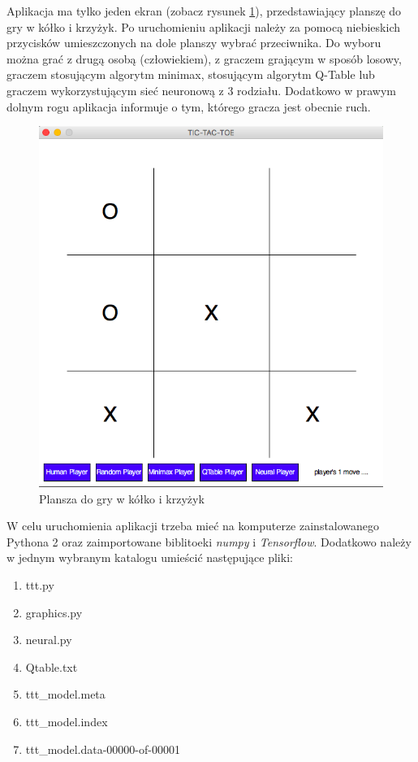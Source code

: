 \documentclass[licencjacka]{pracamgr}
\begin{document}
Aplikacja ma tylko jeden ekran (zobacz rysunek \ref{Rys34}), przedstawiający planszę do gry w kółko i krzyżyk. Po uruchomieniu aplikacji 
należy za pomocą niebieskich przycisków umieszczonych na dole planszy wybrać przeciwnika. Do wyboru można grać z drugą osobą (człowiekiem), 
z graczem grającym w sposób losowy,  graczem stosującym algorytm minimax, stosującym algorytm Q-Table lub graczem wykorzystującym sieć neuronową 
z 3 rodziału. Dodatkowo w prawym dolnym rogu aplikacja informuje o tym, którego gracza jest obecnie ruch.

\begin{figure}[h!]
	\includegraphics [scale=0.45] {plansza.png}
	\caption{Plansza do gry w kółko i krzyżyk}
	\label{Rys34}
\end{figure} 

W celu uruchomienia aplikacji trzeba mieć na komputerze zainstalowanego Pythona 2 oraz zaimportowane biblitoeki \textit{numpy} i \textit{Tensorflow}. Dodatkowo należy w jednym wybranym katalogu umieścić następujące 
pliki:
\begin{enumerate}
	\item{ttt.py}
	\item{graphics.py}
	\item{neural.py}
	\item{Qtable.txt}
	\item{ttt\_model.meta}
	\item{ttt\_model.index}
	\item{ttt\_model.data-00000-of-00001}
\end{enumerate}
\end{document}
